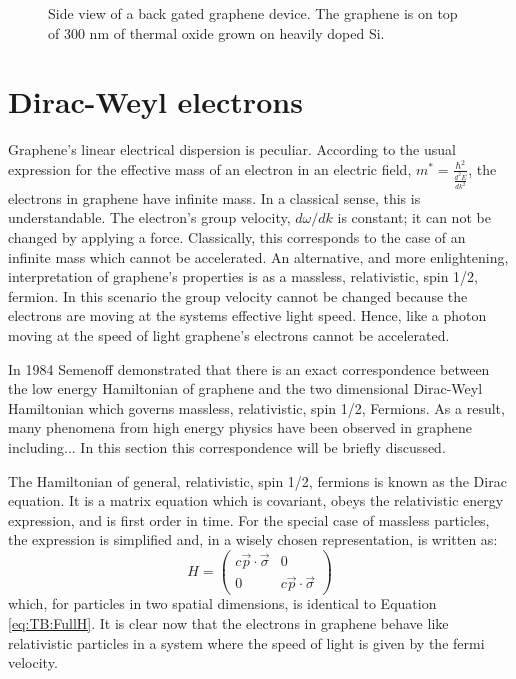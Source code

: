 \begin{figure}
	\begin{center}
	
	\end{center}
	\caption{\label{fig:TB:FET} Side view of a back gated graphene device.  The graphene is on top of 300 nm of thermal oxide grown on heavily doped Si. }	
\end{figure}

\section{Dirac-Weyl electrons}
Graphene's linear electrical dispersion is peculiar.
According to the usual expression for the effective mass of an electron in an electric field, $m^*=\frac{\hbar^2}{\frac{d^2 E}{d k^2}}$, \cite{Kittel2005} the electrons in graphene have infinite mass.
In a classical sense, this is understandable.
The electron's group velocity, $d \omega/d k$ is constant; it can not be changed by applying a force.
Classically, this corresponds to the case of an infinite mass which cannot be accelerated.
An alternative, and more enlightening, interpretation of graphene's properties is as a massless, relativistic, spin 1/2, fermion.
In this scenario the group velocity cannot be changed because the electrons are moving at the systems effective light speed.
Hence, like a photon moving at the speed of light graphene's electrons cannot be accelerated.

In 1984 Semenoff demonstrated that there is an exact correspondence between the low energy Hamiltonian of graphene and the two dimensional Dirac-Weyl Hamiltonian\cite{Semenoff1984} which governs massless, relativistic, spin 1/2, Fermions.
As a result, many phenomena from high energy physics have been observed in graphene including...
In this section this correspondence will be briefly discussed.

The Hamiltonian of general, relativistic, spin 1/2, fermions is known as the Dirac equation.
It is a matrix equation which is covariant, obeys the relativistic energy expression, and is first order in time.
For the special case of massless particles, the expression is simplified and, in a wisely chosen representation, is written as:
\begin{equation*}
	H=\left( \begin{array}{cc}
			c \vec{p} \cdot \vec{\sigma}              & 0\\
			0              & c \vec{p} \cdot \vec{\sigma}			   	            			\end{array} \right)
\end{equation*}
which, for particles in two spatial dimensions, is identical to Equation \ref{eq:TB:FullH}.
It is clear now that the electrons in graphene behave like relativistic particles in a system where the speed of light is given by the fermi velocity.

